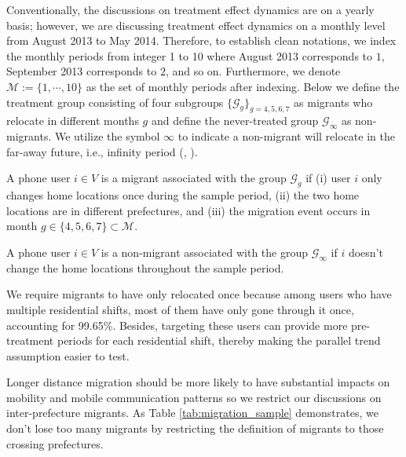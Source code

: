 Conventionally, the discussions on treatment effect dynamics are on a yearly basis; however, we are discussing treatment effect dynamics on a monthly level from August 2013 to May 2014. Therefore, to establish clean notations, we index the monthly periods from integer 1 to 10 where August 2013 corresponds to $1$, September 2013 corresponds to $2$, and so on. Furthermore, we denote $\mathcal{M} := \{1, \cdots, 10\}$ as the set of monthly periods after indexing. Below we define the treatment group consisting of four subgroups $\{ \mathcal{G}_g \}_{g=4,5,6,7}$ as migrants who relocate in different months $g$ and define the never-treated group $\mathcal{G}_{\infty}$ as non-migrants. We utilize the symbol $\infty$ to indicate a non-migrant will relocate in the far-away future, i.e., infinity period (\cite{sun2021estimating}, \cite{borusyak2024revisiting}).

\begin{definition}[Migrants]\label{def:migrants}
A phone user $i \in V$ is a migrant associated with the group $\mathcal{G}_g$ if (i) user $i$ only changes home locations once during the sample period, (ii) the two home locations are in different prefectures, and (iii) the migration event occurs in month $g \in \{4,5,6,7\} \subset \mathcal{M}$.
\end{definition}

\begin{definition}
A phone user $i \in V$ is a non-migrant associated with the group $\mathcal{G}_{\infty}$ if $i$ doesn't change the home locations throughout the sample period.
\end{definition}

We require migrants to have only relocated once because among users who have multiple residential shifts, most of them have only gone through it once, accounting for 99.65\%. Besides, targeting these users can provide more pre-treatment periods for each residential shift, thereby making the parallel trend assumption easier to test.

Longer distance migration should be more likely to have substantial impacts on mobility and mobile communication patterns so we restrict our discussions on inter-prefecture migrants. As Table \ref{tab:migration_sample} demonstrates, we don't lose too many migrants by restricting the definition of migrants to those crossing prefectures.

